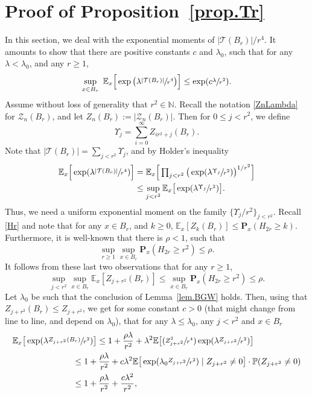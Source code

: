 \documentclass[JEP,XML,SOM,Unicode,NoFloatCountersInSection,published]{cedram}
\newcommand{\Psfrac}[2]{(\sfrac{#1}{#2})}
\let\ts\textstyle
\theoremstyle{plain}
\theoremstyle{definition}
\newcommand\bE{\mathbb{E}}
\newcommand{\1}{{\text{\Large $\mathfrak 1$}}}
\begin{document}
\section{Proof of Proposition~\ref{prop.Tr}}\label{sec-Tr}
In this section, we deal with the exponential moments of
$ |\mathcal T(B_r)|/r^4$. It amounts to show that there are positive constants $c$ and $\lambda_0$, such that for
any $\lambda<\lambda_0$, and any $r\ge 1$,
\[
\sup_{x\in B_r} \ \mathbb E_x\Big[
\exp\big(\lambda\sfrac{ |\mathbf{\mathcal T}(B_r)|}{r^4}\big)\Big]
\le \exp(c\sfrac{\lambda}{r^2}).
\]
Assume without loss of generality that $r^2\in \mathbb N$. Recall the notation \eqref{ZnLambda} for $\mathcal Z_n(B_r)$, and let $Z_n(B_r) := |\mathcal Z_n(B_r)|$.
Then for $0\le j<r^2$, we define
\begin{equation*}
\Upsilon_j=\sum_{i=0}^\infty Z_{ir^2+j}(B_r).
\end{equation*}
Note that $ |\mathcal T(B_r)|=\sum_{j<r^2} \Upsilon_j$, and by Holder's
inequality
\begin{equation}\label{old-2}
\begin{aligned}
\bE_x\Big[\exp(\lambda \sfrac{|\mathcal T(B_r)|}{r^4})\Big]&=
\bE_x\Big[\ts\prod_{j<r^2}\big(
\exp(\lambda\sfrac{\Upsilon_j}{r^2})\big)^{1/r^2}\Big]\\
&\le
\sup_{j<r^2} \bE_x\big[\exp(\lambda\sfrac{\Upsilon_j}{r^2})\big].
\end{aligned}
\end{equation}
Thus, we need a uniform exponential moment on the family
$\{\Upsilon_j/r^2\}_{j<r^2}$.
Recall \eqref{Hr} and note that for any $x\in B_r$, and $k\ge 0$, $\mathbb E_x[Z_k(B_r)] \le \mathbf P_x(H_{2r}\ge k)$. Furthermore,
it is well-known that
there is $\rho<1$, such that
\[
\sup_{r\ge 1} \sup_{x\in B_r} \mathbf P_x(H_{2r} \ge r^2)\le \rho.
\]
It follows from these last two observations that for any $r\ge 1$,
\[
\sup_{j<r^2}\sup_{x\in B_r} \mathbb E_x[Z_{j+r^2}(B_r)]
\le \sup_{x\in B_r} \mathbf P_x(H_{2r}\ge r^2) \le \rho.
\]
Let $\lambda_0$ be such that the conclusion of Lemma~\ref{lem.BGW} holds.
Then, using that $Z_{j+r^2}(B_r)\le Z_{j+r^2}$,
we get for some constant $c>0$ (that might change from line to line, and depend on $\lambda_0$),
that for any $\lambda\le \lambda_0$, any $j<r^2$ and $x\in B_r$
\begin{equation*}
\begin{split}
\bE_x\big[\exp(\lambda \sfrac{Z_{j+r^2}(B_r)}{r^2})\big]&
\le 1+ \frac{\rho \lambda}{r^2} + \lambda^2\mathbb E
\big[\Psfrac{Z_{j+r^2}^2}{r^4}\exp(\lambda \sfrac{Z_{j+r^2}}{r^2})\big]\\
&\hspace*{-1cm} \le 1+ \frac{\rho \lambda}{r^2} +
c\lambda^2
\mathbb E\big[\exp(\lambda_0\sfrac{Z_{j+r^2}}{r^2})
\mid Z_{j+r^2}\neq 0\big]\cdot \mathbb P(Z_{j+r^2} \neq 0) \\
&\hspace*{-1cm} \le 1+ \frac{\rho \lambda}{r^2} +\frac{c \lambda^2}{r^2},
\end{split}
\end{equation*}
\end{document}
